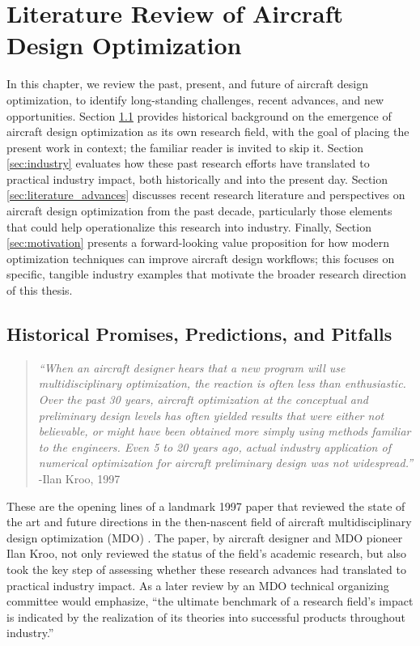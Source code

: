 \chapter{Literature Review of Aircraft Design Optimization}
\label{chap:literature}

In this chapter, we review the past, present, and future of aircraft design optimization, to identify long-standing challenges, recent advances, and new opportunities. Section \ref{sec:history} provides historical background on the emergence of aircraft design optimization as its own research field, with the goal of placing the present work in context; the familiar reader is invited to skip it. Section \ref{sec:industry} evaluates how these past research efforts have translated to practical industry impact, both historically and into the present day. Section \ref{sec:literature_advances} discusses recent research literature and perspectives on aircraft design optimization from the past decade, particularly those elements that could help operationalize this research into industry. Finally, Section \ref{sec:motivation} presents a forward-looking value proposition for how modern optimization techniques can improve aircraft design workflows; this focuses on specific, tangible industry examples that motivate the broader research direction of this thesis.

\section{Historical Promises, Predictions, and Pitfalls}
\label{sec:history}

\begin{quote}
    \textit{``When an aircraft designer hears that a new program will use multidisciplinary optimization, the reaction is often less than enthusiastic. Over the past 30 years, aircraft optimization at the conceptual and preliminary design levels has often yielded results that were either not believable, or might have been obtained more simply using methods familiar to the engineers. Even 5 to 20 years ago, actual industry application of numerical optimization for aircraft preliminary design was not widespread.''}
    \flushright-Ilan Kroo, 1997 \cite{kroo_multidisciplinary_1997}
\end{quote}

These are the opening lines of a landmark 1997 paper that reviewed the state of the art and future directions in the then-nascent field of aircraft multidisciplinary design optimization (MDO) \cite{kroo_multidisciplinary_1997}. The paper, by aircraft designer and MDO pioneer Ilan Kroo, not only reviewed the status of the field's academic research, but also took the key step of assessing whether these research advances had translated to practical industry impact. As a later review by an MDO technical organizing committee would emphasize, ``the ultimate benchmark of a research field's impact is indicated by the realization of its theories into successful products throughout industry.'' \cite{agte_mdo_2010}

